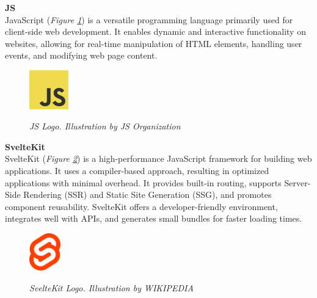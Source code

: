\vspace{0.5cm}
\textbf{JS} \\

JavaScript (\textit{Figure \ref{fig:js-logo}}) is a versatile programming language primarily used for client-side web development. It enables dynamic and interactive functionality on websites, allowing for real-time manipulation of HTML elements, handling user events, and modifying web page content.

\begin{figure}[H]
\centering
\begin{adjustbox}{trim=0cm 0cm, clip}
\includegraphics[width=0.15\textwidth]{imatges/studies_and_decisions/js-logo.png}
\end{adjustbox}
\caption[JS Logo]{\textit{JS Logo. Illustration by JS Organization}}
{\label{fig:js-logo}}
\end{figure}

\newpage

\vspace{0.5cm}
\textbf{SvelteKit} \\

SvelteKit (\textit{Figure \ref{fig:sveltekit-logo}}) is a high-performance JavaScript framework for building web applications. It uses a compiler-based approach, resulting in optimized applications with minimal overhead. It provides built-in routing, supports Server-Side Rendering (SSR) and Static Site Generation (SSG), and promotes component reusability. SvelteKit offers a developer-friendly environment, integrates well with APIs, and generates small bundles for faster loading times.

\begin{figure}[H]
\centering
\begin{adjustbox}{trim=0cm 0cm, clip}
\includegraphics[width=0.12\textwidth]{imatges/studies_and_decisions/sveltekit-logo.png}
\end{adjustbox}
\caption[SvelteKit Logo]{\textit{SvelteKit Logo. Illustration by WIKIPEDIA}}
{\label{fig:sveltekit-logo}}
\end{figure}

